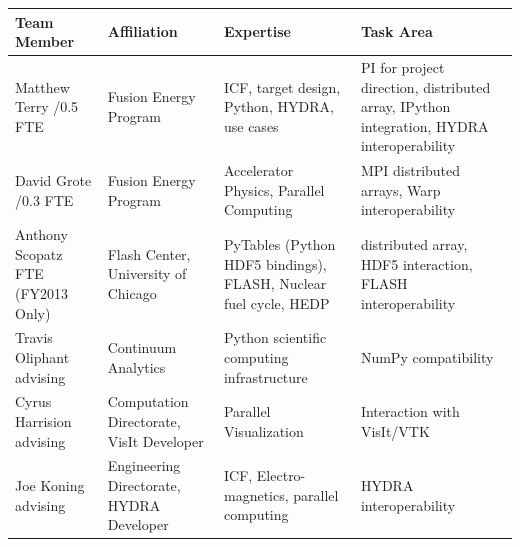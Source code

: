 \documentclass[letterpaper,11pt]{article}
\newlength{\DUtablewidth} %
\begin{document}
\setlength{\DUtablewidth}{\linewidth}
\begin{longtable*}[c]
	{|p{0.187\DUtablewidth}|p{0.251\DUtablewidth}|p{0.260\DUtablewidth}|p{0.251\DUtablewidth}|}
	\hline
	\textbf{Team Member} & \textbf{Affiliation} & \textbf{Expertise} & \textbf{Task Area} \\
	\endfirsthead
	\hline

	Matthew Terry /0.5 FTE &
	Fusion Energy Program &
	ICF, target design, Python, HYDRA, use cases &
	PI for project direction,
	distributed array, IPython integration, HYDRA interoperability \\
	\hline

	David Grote /0.3 FTE &
	Fusion Energy Program &
	Accelerator Physics, Parallel Computing &
	MPI distributed arrays, Warp interoperability \\
	\hline

	Anthony Scopatz  FTE (FY2013 Only) &
	Flash Center, \newline
	University of Chicago &
	PyTables (Python HDF5 bindings), FLASH, Nuclear fuel cycle, HEDP &
	distributed array, HDF5 interaction, FLASH interoperability \\
	\hline

	Travis Oliphant \newline
	advising &
	Continuum Analytics &
	Python scientific computing infrastructure &
	NumPy compatibility \\
	\hline

	Cyrus Harrision \newline
	advising &
	Computation Directorate, \newline
	VisIt Developer &
	Parallel Visualization &
	Interaction with VisIt/VTK  \\
	\hline

	Joe Koning \newline
	advising &
	Engineering Directorate, \newline
	HYDRA Developer & 
	ICF, Electro-magnetics, parallel computing & 
	HYDRA interoperability \\
	\hline

\end{longtable*}

\newpage



\end{document}
